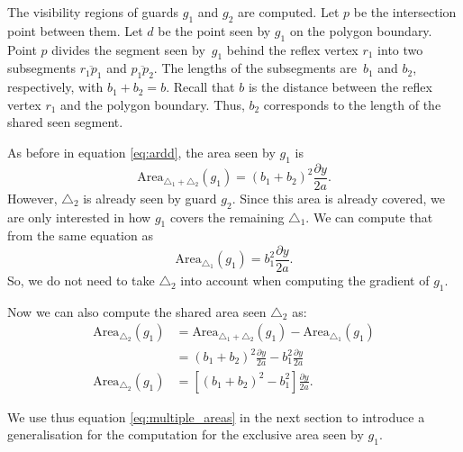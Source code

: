 The visibility regions of guards $g_1$ and $g_2$ are computed. Let $p$ be the intersection point between them. Let $d$ be the point seen by $g_1$ on the polygon boundary. Point $p$ divides the segment seen by~$g_1$ behind the reflex vertex $r_1$ into two subsegments $\overline{r_1p_1}$ and $\overline{p_1p_2}$. The lengths of the subsegments are~$b_1$ and $b_2$, respectively, with $b_1 + b_2 = b$. Recall that $b$ is the distance between the reflex vertex $r_1$ and the polygon boundary. Thus,  $b_2$ corresponds to the length of the shared seen segment.

As before in equation \ref{eq:ardd}, the area seen by $g_1$ is $$\text{Area}_{\triangle_1 + \triangle_2}(g_1) = (b_1 + b_2)^2\frac{\partial y}{2a}.$$
However, $\triangle_2$ is already seen by guard $g_2$. Since this area is already covered, we are only interested in how $g_1$ covers the remaining $\triangle_1$. 
We can compute that from the same equation as $$\text{Area}_{\triangle_1}(g_1) = b_1^2\frac{\partial y}{2a}.$$
So, we do not need to take $\triangle_2$ into account when computing the gradient of $g_1$. 

Now we can also compute the shared area seen $\triangle_2$ as:
\begin{align}
    \text{Area}_{\triangle_2}(g_1) &= \text{Area}_{\triangle_1 + \triangle_2}(g_1) - \text{Area}_{\triangle_1}(g_1) \nonumber \\
                              &= (b_1 + b_2)^2\frac{\partial y}{2a} - b_1^2\frac{\partial y}{2a} \nonumber \\
    \text{Area}_{\triangle_2}(g_1)&= \left[(b_1 + b_2)^2 - b_1^2\right]\frac{\partial y}{2a}. \label{eq:multiple_areas} 
\end{align}

We use thus equation \ref{eq:multiple_areas} in the next section to introduce a generalisation for the computation for the exclusive area seen by $g_1$.

